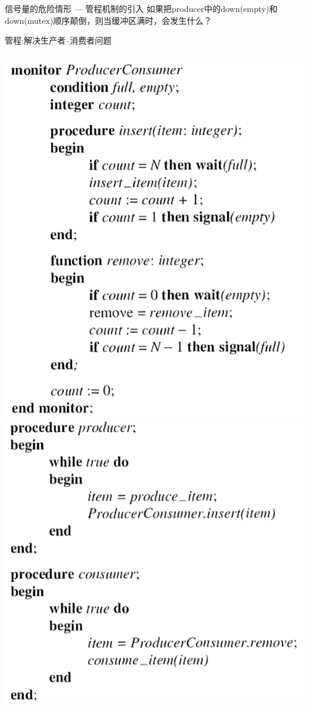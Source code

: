 \documentclass[xcolor=svgnames]{beamer}
\begin{document}
\begin{CJK*}{UTF8}{gbsn}
\begin{frame}{信号量的危险情形 --- 管程机制的引入}
如果把producer中的down(empty)和down(mutex)顺序颠倒，则当缓冲区满时，会发生什么？
\end{frame}

\begin{frame}{管程:解决生产者--消费者问题}
\begin{columns}[b]
\includegraphics[width=1.0\textwidth]{mon1.png}
\includegraphics[width=1.0\textwidth]{mon2.png}
\end{columns}%


\end{frame}
\end{CJK*}
\end{document}
